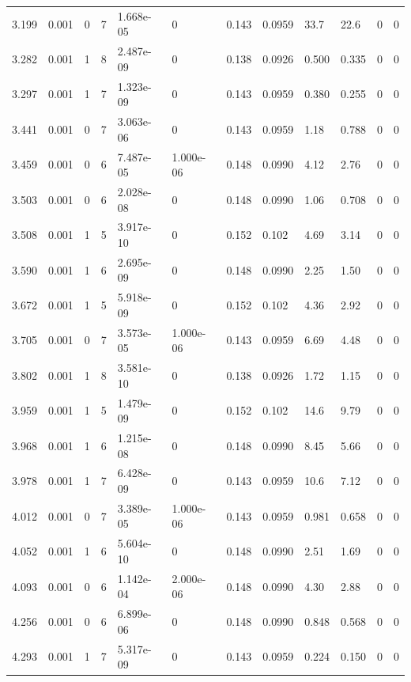 \documentclass[preview]{standalone}
\begin{document}
{{{\begin{tabular}{L{1.2cm}C{1.2cm} C{0.3cm}C{0.5cm} C{1.4cm}C{1.4cm} C{1.4cm}C{1.4cm} C{1.6cm}C{1.6cm} C{1.6cm}C{1.6cm}}
  3.199  &  0.001  & 0     &  7 &  1.668e-05  & 0  &  0.143&   0.0959& 33.7 & 22.6   &  0 & 0  \\ 
  3.282  &  0.001  & 1     &  8 &  2.487e-09  & 0  &  0.138&   0.0926& 0.500 & 0.335   &  0 & 0  \\ 
  3.297  &  0.001  & 1     &  7 &  1.323e-09  & 0  &  0.143&   0.0959& 0.380 & 0.255   &  0 & 0  \\ 
  3.441  &  0.001  & 0     &  7 &  3.063e-06  & 0  &  0.143&   0.0959& 1.18 & 0.788   &  0 & 0  \\ 
  3.459  &  0.001  & 0     &  6 &  7.487e-05  & 1.000e-06  &  0.148&   0.0990& 4.12 & 2.76   &  0 & 0  \\ 
  3.503  &  0.001  & 0     &  6 &  2.028e-08  & 0  &  0.148&   0.0990& 1.06 & 0.708   &  0 & 0  \\ 
  3.508  &  0.001  & 1     &  5 &  3.917e-10  & 0  &  0.152&   0.102& 4.69 & 3.14   &  0 & 0  \\ 
  3.590  &  0.001  & 1     &  6 &  2.695e-09  & 0  &  0.148&   0.0990& 2.25 & 1.50   &  0 & 0  \\ 
  3.672  &  0.001  & 1     &  5 &  5.918e-09  & 0  &  0.152&   0.102& 4.36 & 2.92   &  0 & 0  \\ 
  3.705  &  0.001  & 0     &  7 &  3.573e-05  & 1.000e-06  &  0.143&   0.0959& 6.69 & 4.48   &  0 & 0  \\ 
  3.802  &  0.001  & 1     &  8 &  3.581e-10  & 0  &  0.138&   0.0926& 1.72 & 1.15   &  0 & 0  \\ 
  3.959  &  0.001  & 1     &  5 &  1.479e-09  & 0  &  0.152&   0.102& 14.6 & 9.79   &  0 & 0  \\ 
  3.968  &  0.001  & 1     &  6 &  1.215e-08  & 0  &  0.148&   0.0990& 8.45 & 5.66   &  0 & 0  \\ 
  3.978  &  0.001  & 1     &  7 &  6.428e-09  & 0  &  0.143&   0.0959& 10.6 & 7.12   &  0 & 0  \\ 
  4.012  &  0.001  & 0     &  7 &  3.389e-05  & 1.000e-06  &  0.143&   0.0959& 0.981 & 0.658   &  0 & 0  \\ 
  4.052  &  0.001  & 1     &  6 &  5.604e-10  & 0  &  0.148&   0.0990& 2.51 & 1.69   &  0 & 0  \\ 
  4.093  &  0.001  & 0     &  6 &  1.142e-04  & 2.000e-06  &  0.148&   0.0990& 4.30 & 2.88   &  0 & 0  \\ 
  4.256  &  0.001  & 0     &  6 &  6.899e-06  & 0  &  0.148&   0.0990& 0.848 & 0.568   &  0 & 0  \\ 
  4.293  &  0.001  & 1     &  7 &  5.317e-09  & 0  &  0.143&   0.0959& 0.224 & 0.150   &  0 & 0  \\ 

\end{tabular}}}}
\end{document}
